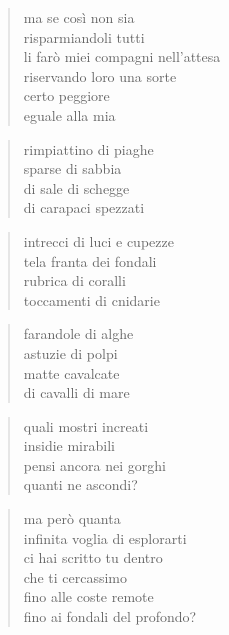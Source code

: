 	\begin{verse}
		ma se così non sia\\
		risparmiandoli tutti\\
		li farò miei compagni nell’attesa\\
		riservando loro una sorte\\
		certo peggiore\\
		eguale alla mia
	\end{verse}


\clearpage



	\begin{verse}
		rimpiattino di piaghe\\
		sparse di sabbia\\
		di sale di schegge\\
		di carapaci spezzati
	\end{verse}

	\begin{verse}
		intrecci di luci e cupezze\\
		tela franta dei fondali\\
		rubrica di coralli\\
		toccamenti di cnidarie
	\end{verse}

	\begin{verse}
		farandole di alghe\\
		astuzie di polpi\\
		matte cavalcate\\
		di cavalli di mare
	\end{verse}

	\begin{verse}
		quali mostri increati\\
		insidie mirabili\\
		pensi ancora nei gorghi\\
		quanti ne ascondi?
	\end{verse}

	\begin{verse}
		ma però quanta\\
		infinita voglia di esplorarti\\
		ci hai scritto tu dentro\\
		che ti cercassimo\\
		fino alle coste remote\\
		fino ai fondali del profondo?
	\end{verse}


\clearpage

